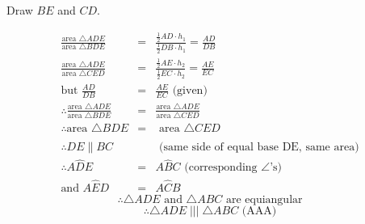\begin{schooltheorem}
{\begin{tabbing}
\>Draw $BE$ and $CD$. \end{tabbing}
\begin{eqnarray*}
\frac{\text{area }\triangle ADE}{\text{area }\triangle BDE} &=& \frac{\frac{1}{2}AD\cdot h_1}{\frac{1}{2}DB\cdot h_1} = \frac{AD}{DB}\\
\frac{\text{area }\triangle ADE}{\text{area }\triangle CED} &=& \frac{\frac{1}{2}AE\cdot h_2}{\frac{1}{2}EC\cdot h_2} = \frac{AE}{EC}\\
\text{but } \frac{AD}{DB} &=& \frac{AE}{EC} \text{    (given)}\\
\therefore \frac{\text{area }\triangle ADE}{\text{area }\triangle BDE} &=& \frac{\text{area }\triangle ADE}{\text{area }\triangle CED}\\
\therefore \text{area }\triangle BDE &=& \text{ area }\triangle CED\\
\\
\therefore DE \parallel BC & &\text{   (same side of equal base DE, same area)}\\
\therefore A\hat{D}E &=& A\hat{B}C  \text{   (corresponding $\angle$'s)}\\
\text{and } A\hat{E}D &=& A\hat{C}{B}
\end{eqnarray*}
$$\therefore \text{$\triangle ADE$ and $\triangle ABC$ are equiangular}$$
$$\therefore \triangle ADE \; ||| \; \triangle ABC \text{   (AAA)}$$

}
\end{schooltheorem}

